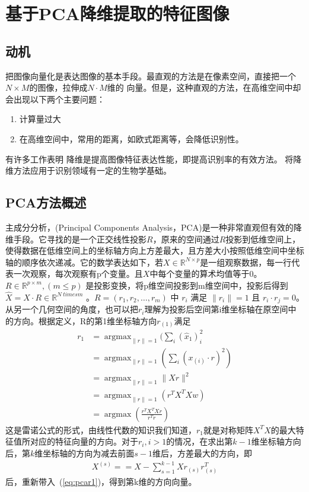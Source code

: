 \section{基于PCA降维提取的特征图像}
\label{sec:pcaDR}
    \subsection{动机}
    把图像向量化是表达图像的基本手段。最直观的方法是在像素空间，直接把一个$N \times M$的图像，拉伸成$N\cdot M$维的 向量。但是，这种直观的方法，在高维空间中却会出现以下两个主要问题：
    \begin{enumerate}
        \item 计算量过大
        \item 在高维空间中，常用的距离，如欧式距离等，会降低识别性。
    \end{enumerate}
    有许多工作表明%
    降维是提高图像特征表达性能，即提高识别率的有效方法。
    将降维方法应用于识别领域有一定的生物学基础。

    \subsection{PCA方法概述}
    主成分分析，(Principal Components Analysis，PCA)是一种非常直观但有效的降维手段。它寻找的是一个正交线性投影$R$，原来的空间通过$R$投影到低维空间上，使得数据在低维空间上的坐标轴方向上方差最大，且方差大小按照低维空间中坐标轴的顺序依次递减。它的数学表达如下，若$X \in \mathbb{R}^{N\times p}  $是一组观察数据，每一行代表一次观察，每次观察有p个变量。且$X$中每个变量的算术均值等于0。$R \in \mathbb{R} ^{p \times m}, (m \leqslant p) $ 是投影变换，将p维空间投影到m维空间中，投影后得到$\hat{X} = X\cdot R \in \mathbb{R}^{N \ times m}$ 。$R = (r_1, r_2, \dots, r_m)$ 中 $r_i$ 满足 $ \|r_i\| = 1$ 且 $r_i \cdot r_j = 0$。从另一个几何空间的角度，也可以把$r_i$理解为投影后空间第i维坐标轴在原空间中的方向。根据定义，R的第1维坐标轴方向$r_{(1)}$满足
    \begin{equation}
    \label{eq:pcar1}
    \begin{split}
        r_{1} & = \mathop{\arg\max}_{\|r\|=1} (\sum_i(\hat{x} _1)^2_{i} \\
        & = \mathop{\arg\max}_{\|r\| = 1}(\sum_i(x_{(i)}\cdot r)^2) \\
        & = \mathop{\arg\max} _{\|r\|=1} \|Xr\|^2 \\
        & = \mathop{arg\max}_{\|r\|= 1} (r^TX^TXw) \\
        & = \mathop{\arg\max} (\frac{r^TX^TXr}{r^Tr}) 
    \end{split}
    \end{equation}
    这是雷诺公式\cite{rayleigh}的形式，由线性代数的知识我们知道，$r_1$就是对称矩阵$X^TX$的最大特征值所对应的特征向量的方向。对于$r_i, i > 1$的情况，在求出第$k-1$维坐标轴方向后，第$k$维坐标轴的方向为减去前面$s-1$维后，方差最大的方向，即
    \begin{equation}
    \begin{split}
        X^{(s)} = = X - \sum^{k - 1}_{s = 1} Xr_{(s)}r_{(s)}^T
    \end{split}    
    \end{equation}
    后，重新带入~(\ref{eq:pcar1})，得到第k维的方向向量。

